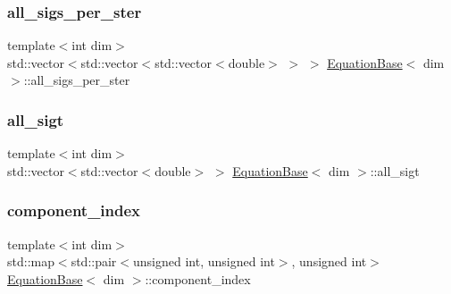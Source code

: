 \subsubsection{\texorpdfstring{all\+\_\+sigs\+\_\+per\+\_\+ster}{all\_sigs\_per\_ster}}
{\footnotesize\ttfamily template$<$int dim$>$ \\
std\+::vector$<$std\+::vector$<$std\+::vector$<$double$>$ $>$ $>$ \hyperlink{class_equation_base}{Equation\+Base}$<$ dim $>$\+::all\+\_\+sigs\+\_\+per\+\_\+ster\hspace{0.3cm}{\ttfamily [protected]}}

\mbox{\label{class_equation_base_a818488c38892b44ccf25eb6f61e89ecc}} 
\subsubsection{\texorpdfstring{all\+\_\+sigt}{all\_sigt}}
{\footnotesize\ttfamily template$<$int dim$>$ \\
std\+::vector$<$std\+::vector$<$double$>$ $>$ \hyperlink{class_equation_base}{Equation\+Base}$<$ dim $>$\+::all\+\_\+sigt\hspace{0.3cm}{\ttfamily [protected]}}

\mbox{\label{class_equation_base_a7e2b3d305d1f1f7799acff6c86bc67f8}} 
\subsubsection{\texorpdfstring{component\+\_\+index}{component\_index}}
{\footnotesize\ttfamily template$<$int dim$>$ \\
std\+::map$<$std\+::pair$<$unsigned int, unsigned int$>$, unsigned int$>$ \hyperlink{class_equation_base}{Equation\+Base}$<$ dim $>$\+::component\+\_\+index\hspace{0.3cm}{\ttfamily [protected]}}

\mbox{\label{class_equation_base_adf124367d26087d33b6f252aa3cdd0a3}} 
